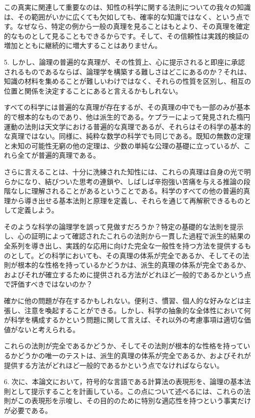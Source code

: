 \documentclass[a4paper,11pt,openany]{ltjsbook}
\begin{document}
この真実に関連して重要なのは、知性の科学に関する法則についての我々の知識は、その範囲がいかに広くても欠如しても、確率的な知識ではなく、という点です。なぜなら、特定の例から一般の真理を見ることはもとより、その真理を確定的なものとして見ることもできるからです。そして、その信頼性は実践的検証の増加とともに継続的に増大することはありません。

5. しかし、論理の普遍的な真理が、その性質上、心に提示されると即座に承認されるものであるならば、論理学を構築する難しさはどこにあるのか？それは、知識の材料を集めることが難しいわけではなく、それらの性質を区別し、相互の位置と関係を決定することにあると言えるかもしれない。

すべての科学には普遍的な真理が存在するが、その真理の中でも一部のみが基本的で根本的なものであり、他は派生的である。ケプラーによって発見された楕円運動の法則は天文学における普遍的な真理であるが、それらはその科学の基本的な真理ではない。同様に、純粋な数学の科学でも同じである。既知の無数の定理と未知の可能性无窮の他の定理は、少数の単純な公理の基礎に立っているが、これら全てが普遍的真理である。

さらに言えることは、十分に洗練された知性には、これらの真理は自身の光で明らかになり、結びついた思考の連鎖や、しばしば辛抱強い苦痛を与える推論の段階なしに理解されることがあるということである。科学のすべての他の普遍的真理から導き出せる基本法則と原理を定義し、それらを通じて再解釈できるものとして定義しよう。

そのような科学の論理学を誤って見做すだろうか？特定の基礎的な法則を提示し、心の証明によって確認されたこれらの法則から一貫した過程で派生的結果の全系列を導き出し、実践的な応用に向けた完全な一般性を持つ方法を提供するものとして。どの科学においても、その真理の体系が完全であるか、そしてその法則が根本的な性格を持っているかどうかは、派生的真理の体系が完全であるか、およびそれが確立するために提供される方法がどれほど一般的であるかという点で評価すべきではないのか？

確かに他の問題が存在するかもしれない。便利さ、慣習、個人的な好みなどは主張し、注意を喚起することができる。しかし、科学の抽象的な全体性において何が科学を構成するかという問題に関して言えば、それ以外の考慮事項は適切な価値がないと考えられる。

これらの法則が完全であるかどうか、そしてその法則が根本的な性格を持っているかどうかの唯一のテストは、派生的真理の体系が完全であるか、およびそれが提供する方法がどれほど一般的であるかという点でなければならない。

6. 次に、本論文において，符号的な言語である計算法の表現形を、論理の基本法則として提示することを計画している。この点について述べるには、これらの法則がこの表現形を示唆し、その目的のために特別な適応性を持つという事実だけが必要である。
\end{document}
